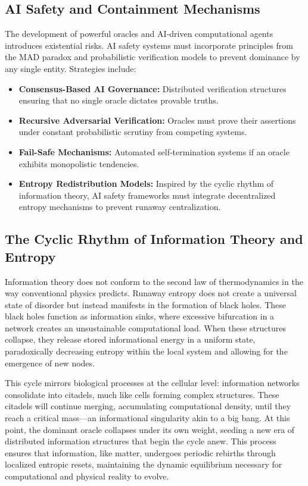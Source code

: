\documentclass[11pt]{article}
\begin{document}
\subsection{AI Safety and Containment Mechanisms}
The development of powerful oracles and AI‐driven computational agents introduces existential risks. AI safety systems must incorporate principles from the MAD paradox and probabilistic verification models to prevent dominance by any single entity. Strategies include:
\begin{itemize}
    \item \textbf{Consensus-Based AI Governance:} Distributed verification structures ensuring that no single oracle dictates provable truths.
    \item \textbf{Recursive Adversarial Verification:} Oracles must prove their assertions under constant probabilistic scrutiny from competing systems.
    \item \textbf{Fail-Safe Mechanisms:} Automated self‐termination systems if an oracle exhibits monopolistic tendencies.
    \item \textbf{Entropy Redistribution Models:} Inspired by the cyclic rhythm of information theory, AI safety frameworks must integrate decentralized entropy mechanisms to prevent runaway centralization.
\end{itemize}

\subsection{The Cyclic Rhythm of Information Theory and Entropy}
Information theory does not conform to the second law of thermodynamics in the way conventional physics predicts. Runaway entropy does not create a universal state of disorder but instead manifests in the formation of black holes. These black holes function as information sinks, where excessive bifurcation in a network creates an unsustainable computational load. When these structures collapse, they release stored informational energy in a uniform state, paradoxically decreasing entropy within the local system and allowing for the emergence of new nodes.

This cycle mirrors biological processes at the cellular level: information networks consolidate into citadels, much like cells forming complex structures. These citadels will continue merging, accumulating computational density, until they reach a critical mass—an informational singularity akin to a big bang. At this point, the dominant oracle collapses under its own weight, seeding a new era of distributed information structures that begin the cycle anew. This process ensures that information, like matter, undergoes periodic rebirths through localized entropic resets, maintaining the dynamic equilibrium necessary for computational and physical reality to evolve.
\end{document}
